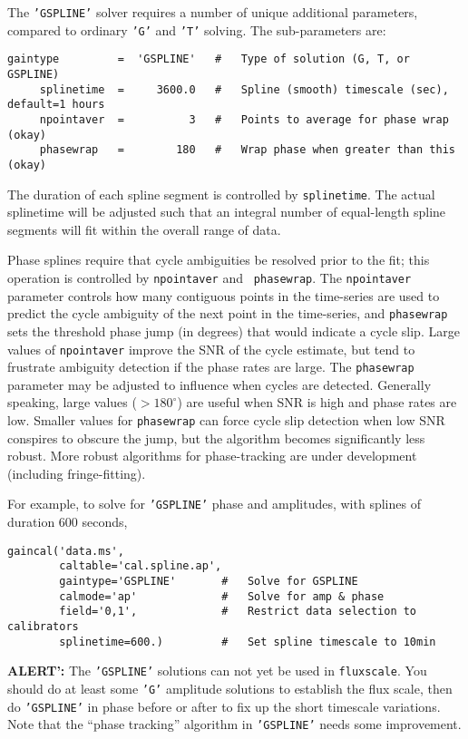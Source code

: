 {The {\tt 'GSPLINE'} solver requires a number of unique additional parameters,
compared to ordinary {\tt 'G'} and {\tt 'T'} solving.  The sub-parameters are:
\small
\begin{verbatim}
gaintype         =  'GSPLINE'   #   Type of solution (G, T, or GSPLINE)
     splinetime  =     3600.0   #   Spline (smooth) timescale (sec), default=1 hours
     npointaver  =          3   #   Points to average for phase wrap (okay)
     phasewrap   =        180   #   Wrap phase when greater than this (okay)
\end{verbatim}
\normalsize

The duration of each spline segment is controlled by {\tt splinetime}.
The actual splinetime will be adjusted such that an integral number of
equal-length spline segments will fit within the overall range of
data.

Phase splines require that cycle ambiguities be resolved prior to the
fit; this operation is controlled by {\tt npointaver} and {\tt
phasewrap}.  The {\tt npointaver} parameter controls how many
contiguous points in the time-series are used to predict the cycle
ambiguity of the next point in the time-series, and {\tt phasewrap} sets
the threshold phase jump (in degrees) that would indicate a cycle
slip.  Large values of {\tt npointaver} improve the SNR of the cycle
estimate, but tend to frustrate ambiguity detection if the phase rates
are large.  The {\tt phasewrap} parameter may be adjusted to influence
when cycles are detected.  Generally speaking, large values
($>180^\circ$) are useful when SNR is high and phase rates are
low. Smaller values for {\tt phasewrap} can force cycle slip detection
when low SNR conspires to obscure the jump, but the algorithm becomes
significantly less robust.  More robust algorithms for phase-tracking
are under development (including fringe-fitting).

For example, to solve for {\tt 'GSPLINE'} phase and amplitudes, with
splines of duration 600 seconds, 
\small
\begin{verbatim}
gaincal('data.ms',
        caltable='cal.spline.ap',
        gaintype='GSPLINE'       #   Solve for GSPLINE
        calmode='ap'             #   Solve for amp & phase
        field='0,1',             #   Restrict data selection to calibrators
        splinetime=600.)         #   Set spline timescale to 10min
\end{verbatim}
\normalsize

{\bf ALERT':} The {\tt 'GSPLINE'} solutions can not yet be
used in {\tt fluxscale}.  You should do at least some {\tt 'G'}
amplitude solutions to establish the flux scale, then do 
{\tt 'GSPLINE'} in phase before or after to fix up the short 
timescale variations.  Note that the ``phase tracking'' algorithm
in {\tt 'GSPLINE'} needs some improvement.

}
